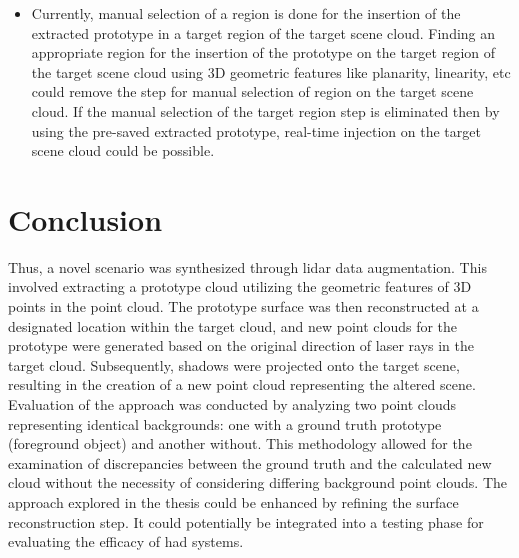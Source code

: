 \begin{itemize}
    \item Currently, manual selection of a region is done for the insertion of the extracted prototype in a target region of the target scene cloud. Finding an appropriate region for the insertion of the prototype on the target region of the target scene cloud using 3D geometric features like planarity, linearity, etc could remove the step for manual selection of region on the target scene cloud. If the manual selection of the target region step is eliminated then by using the pre-saved extracted prototype, real-time injection on the target scene cloud could be possible.
\end{itemize}

\section{Conclusion}
Thus, a novel scenario was synthesized through lidar data augmentation. This involved extracting a prototype cloud utilizing the geometric features of 3D points in the point cloud. The prototype surface was then reconstructed at a designated location within the target cloud, and new point clouds for the prototype were generated based on the original direction of laser rays in the target cloud. Subsequently, shadows were projected onto the target scene, resulting in the creation of a new point cloud representing the altered scene. Evaluation of the approach was conducted by analyzing two point clouds representing identical backgrounds: one with a ground truth prototype (foreground object) and another without. This methodology allowed for the examination of discrepancies between the ground truth and the calculated new cloud without the necessity of considering differing background point clouds. The approach explored in the thesis could be enhanced by refining the surface reconstruction step. It could potentially be integrated into a testing phase for evaluating the efficacy of \acrfull{had} systems.